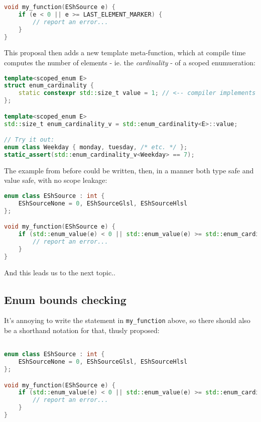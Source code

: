 \documentclass[
  format=manuscript,
  screen=true,
  review=false,
  nonacm=true,
  timestamp=true,
  balance=false]{acmart}
\begin{document}
\begin{lstlisting}[language=Cpp]
void my_function(EShSource e) {
    if (e < 0 || e >= LAST_ELEMENT_MARKER) {
        // report an error...
    }
}
\end{lstlisting}


\noindent
This proposal then adds a new template meta-function, which at compile time computes
the number of elements - ie. the \textit{cardinality} - of a scoped enumueration:\vspace{2mm}

\begin{lstlisting}[language=Cpp]
template<scoped_enum E>
struct enum_cardinality {
    static constexpr std::size_t value = 1; // <-- compiler implements this
};

template<scoped_enum E>
std::size_t enum_cardinality_v = std::enum_cardinality<E>::value;

// Try it out:
enum class Weekday { monday, tuesday, /* etc. */ };
static_assert(std::enum_cardinality_v<Weekday> == 7);
\end{lstlisting}

\noindent
The example from before could be written, then, in a manner both type safe and
value safe, with no scope leakage:\vspace{2mm}

\begin{lstlisting}[language=Cpp]
enum class EShSource : int {
    EShSourceNone = 0, EShSourceGlsl, EShSourceHlsl
};

void my_function(EShSource e) {
    if (std::enum_value(e) < 0 || std::enum_value(e) >= std::enum_cardinality_v<EShSource>) {
        // report an error...
    }
}
\end{lstlisting}

And this leads us to the next topic..


\subsection{Enum bounds checking}

It's annoying to write the statement in \texttt{my\_function} above, so there
should also be a shorthand notation for that, thusly proposed:

\begin{lstlisting}[language=Cpp]

enum class EShSource : int {
    EShSourceNone = 0, EShSourceGlsl, EShSourceHlsl
};

void my_function(EShSource e) {
    if (std::enum_value(e) < 0 || std::enum_value(e) >= std::enum_cardinality_v<EShSource>) {
        // report an error...
    }
}
\end{lstlisting}
\end{document}
